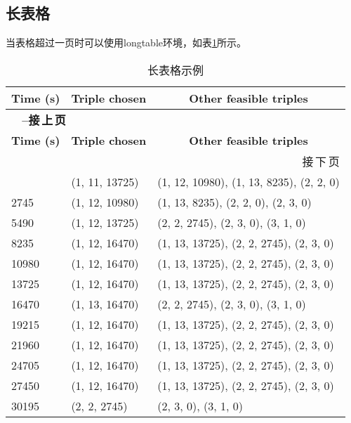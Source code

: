 \subsection{长表格}
\label{subsec-longtab}
当表格超过一页时可以使用longtable环境，如表\ref{tab-long-example}所示。

\begin{longtable}{|l|l|l|}
    \caption{长表格示例\label{tab-long-example}} \\
    \hline
    \multicolumn{1}{|c|}{\textbf{Time (s)}} &
    \multicolumn{1}{c|}{\textbf{Triple chosen}} &
    \multicolumn{1}{c|}{\textbf{Other feasible triples}} \\ \hline
    \endfirsthead
    \multicolumn{3}{l}{{\bfseries\tablename\ \thetable{} --接\,上\,页}} \\
    \hline \multicolumn{1}{|c|}{\textbf{Time (s)}} &
    \multicolumn{1}{c|}{\textbf{Triple chosen}} &
    \multicolumn{1}{c|}{\textbf{Other feasible triples}} \\ \hline
    \endhead
    \hline \multicolumn{3}{|r|}{{接\,下\,页}} \\ \hline
    \endfoot
    \hline \hline
    \endlastfoot
    0      & (1, 11, 13725) & (1, 12, 10980), (1, 13, 8235), (2, 2, 0) \\
    2745   & (1, 12, 10980) & (1, 13,  8235), (2,  2,    0), (2, 3, 0) \\
    5490   & (1, 12, 13725) & (2,  2,  2745), (2,  3,    0), (3, 1, 0) \\
    8235   & (1, 12, 16470) & (1, 13, 13725), (2,  2, 2745), (2, 3, 0) \\
    10980  & (1, 12, 16470) & (1, 13, 13725), (2,  2, 2745), (2, 3, 0) \\
    13725  & (1, 12, 16470) & (1, 13, 13725), (2,  2, 2745), (2, 3, 0) \\
    16470  & (1, 13, 16470) & (2,  2,  2745), (2,  3,    0), (3, 1, 0) \\
    19215  & (1, 12, 16470) & (1, 13, 13725), (2,  2, 2745), (2, 3, 0) \\
    21960  & (1, 12, 16470) & (1, 13, 13725), (2,  2, 2745), (2, 3, 0) \\
    24705  & (1, 12, 16470) & (1, 13, 13725), (2,  2, 2745), (2, 3, 0) \\
    27450  & (1, 12, 16470) & (1, 13, 13725), (2,  2, 2745), (2, 3, 0) \\
    30195  & (2,  2,  2745) & (2,  3,     0), (3,  1,    0)            \\

\end{longtable}
